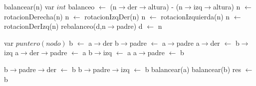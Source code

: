 \begin{algorithm}\phantom{[H]}
\begin{algorithmic}[1]
  \State balancear(n) 
  \State var $int$ balanceo $\gets$ (n$\rightarrow$der$\rightarrow$altura) - (n$\rightarrow$izq$\rightarrow$altura) 
   
     
      \State n $\gets$ rotacionDerecha(n) 
    \Else
      \State n $\gets$ rotacionIzqDer(n) 
    \EndIf
  \Else  
     
       
        \State n $\gets$ rotacionIzquierda(n) 
      \Else
        \State n $\gets$ rotacionDerIzq(n) 
      \EndIf
    \EndIf
  \EndIf
   
     \State rebalanceo(d,n$\rightarrow$padre) 
  \Else
     \State d $\gets$ n 
  \EndIf

\EndFunction
\end{algorithmic}
\end{algorithm}



\begin{algorithm}\phantom{[H]}
\begin{algorithmic}[1]
   \State var $puntero(nodo)$ b $\gets$ a$\rightarrow$der 
   \State b$\rightarrow$padre $\gets$ a$\rightarrow$padre 
   \State a$\rightarrow$der $\gets$ b$\rightarrow$izq 
    
     \State a$\rightarrow$der$\rightarrow$padre $\gets$ a 
   \EndIf
   \State b$\rightarrow$izq $\gets$ a 
   \State a$\rightarrow$padre $\gets$ b 
   
    
      
       \State b$\rightarrow$padre$\rightarrow$der $\gets$ b 
     \Else
       \State b$\rightarrow$padre$\rightarrow$izq $\gets$ b 
     \EndIf
  \EndIf
  \State balancear(a) 
  \State balancear(b) 
  \State res $\gets$ b 
\EndFunction
\end{algorithmic}
\end{algorithm}




